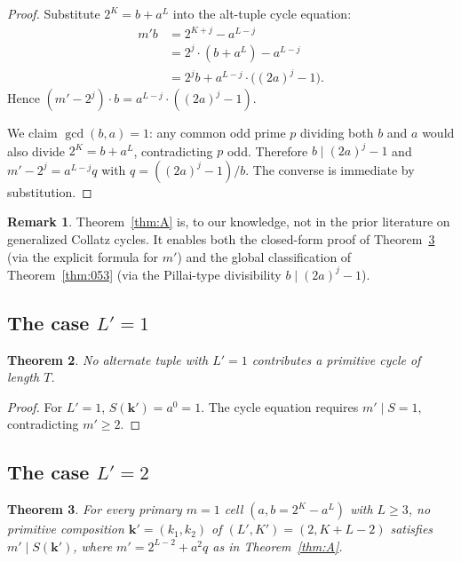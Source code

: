 \documentclass[11pt]{amsart}
\theoremstyle{plain}
\newtheorem{theorem}{Theorem}
\theoremstyle{definition}
\newtheorem{remark}[theorem]{Remark}
\begin{document}
\begin{proof}
Substitute $2^K = b + a^L$ into the alt-tuple cycle equation:
\begin{align*}
m' b &= 2^{K+j} - a^{L-j} \\
     &= 2^j \cdot (b + a^L) - a^{L-j} \\
     &= 2^j b + a^{L-j} \cdot \big((2a)^j - 1\big).
\end{align*}
Hence $(m' - 2^j) \cdot b = a^{L-j} \cdot ((2a)^j - 1)$.

We claim $\gcd(b, a) = 1$: any common odd prime $p$ dividing both
$b$ and $a$ would also divide $2^K = b + a^L$, contradicting $p$ odd.
Therefore $b \mid (2a)^j - 1$ and $m' - 2^j = a^{L-j} q$ with
$q = ((2a)^j - 1)/b$. The converse is immediate by substitution.
\end{proof}

\begin{remark}
Theorem~\ref{thm:A} is, to our knowledge, not in the prior literature
on generalized Collatz cycles. It enables both the closed-form proof
of Theorem~\ref{thm:C} (via the explicit formula for $m'$) and the
global classification of Theorem~\ref{thm:053} (via the Pillai-type
divisibility $b \mid (2a)^j - 1$).
\end{remark}

\subsection{The case $L' = 1$}

\begin{theorem} \label{thm:B}
No alternate tuple with $L' = 1$ contributes a primitive cycle of
length $T$.
\end{theorem}

\begin{proof}
For $L' = 1$, $S(\mathbf{k}') = a^0 = 1$. The cycle equation requires
$m' \mid S = 1$, contradicting $m' \geq 2$.
\end{proof}

\subsection{The case $L' = 2$}

\begin{theorem} \label{thm:C}
For every primary $m = 1$ cell $(a, b = 2^K - a^L)$ with $L \geq 3$,
no primitive composition $\mathbf{k}' = (k_1, k_2)$ of $(L', K') =
(2, K + L - 2)$ satisfies $m' \mid S(\mathbf{k}')$, where
$m' = 2^{L-2} + a^2 q$ as in Theorem~\ref{thm:A}.
\end{theorem}
\end{document}
